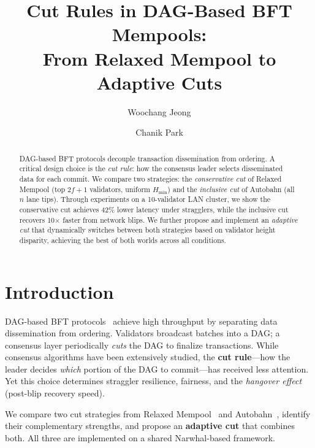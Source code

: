 \documentclass[sigconf,10pt,nonacm]{acmart}
\begin{document}
\title{Cut Rules in DAG-Based BFT Mempools:\\From Relaxed Mempool to Adaptive Cuts}

\author{Woochang Jeong}

\author{Chanik Park}

\begin{abstract}
DAG-based BFT protocols decouple transaction dissemination from ordering. A critical design choice is the \emph{cut rule}: how the consensus leader selects disseminated data for each commit. We compare two strategies: the \emph{conservative cut} of Relaxed Mempool (top $2f{+}1$ validators, uniform $H_{\min}$) and the \emph{inclusive cut} of Autobahn (all $n$ lane tips). Through experiments on a 10-validator LAN cluster, we show the conservative cut achieves 42\% lower latency under stragglers, while the inclusive cut recovers 10$\times$ faster from network blips. We further propose and implement an \emph{adaptive cut} that dynamically switches between both strategies based on validator height disparity, achieving the best of both worlds across all conditions.
\end{abstract}

\maketitle
\vspace{-1em}

\section{Introduction}
\vspace{-0.3em}

DAG-based BFT protocols~\cite{narwhal,bullshark,autobahn} achieve high throughput by separating data dissemination from ordering. Validators broadcast batches into a DAG; a consensus layer periodically \emph{cuts} the DAG to finalize transactions. While consensus algorithms have been extensively studied, the \textbf{cut rule}---how the leader decides \emph{which} portion of the DAG to commit---has received less attention. Yet this choice determines straggler resilience, fairness, and the \emph{hangover effect}~\cite{autobahn} (post-blip recovery speed).

We compare two cut strategies from Relaxed Mempool~\cite{relaxed} and Autobahn~\cite{autobahn}, identify their complementary strengths, and propose an \textbf{adaptive cut} that combines both. All three are implemented on a shared Narwhal-based framework.
\end{document}
